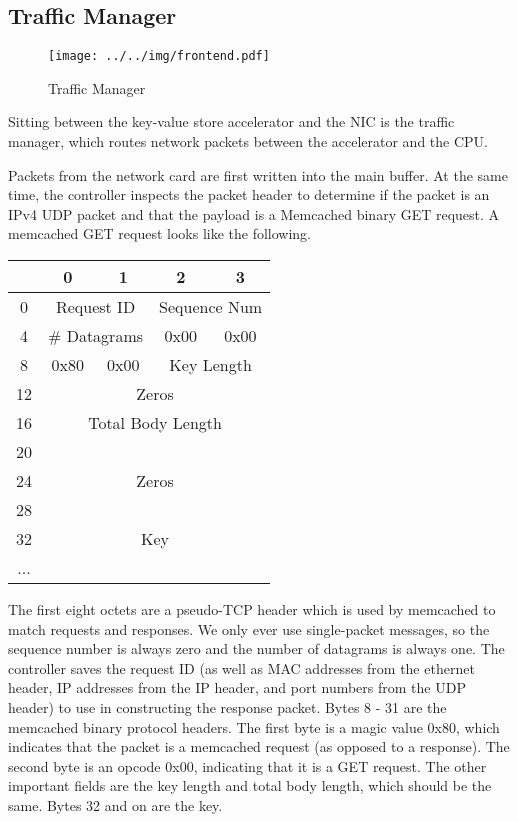 \subsection{Traffic Manager}
\begin{figure}
    \begin{center}
        \label{fig:frontend}  
\texttt{[image: ../../img/frontend.pdf]}
        \caption{Traffic Manager}
    \end{center}
\end{figure}

Sitting between the key-value store accelerator and the NIC is the traffic
manager, which routes network packets between the accelerator and the CPU.

Packets from the network card are first written into the main buffer.
At the same time, the controller inspects the packet header to determine if
the packet is an IPv4 UDP packet and that the payload is a Memcached binary
GET request. A memcached GET request looks like the following.

\begin{center}
    \begin{tabular}{|c|c|c|c|c|}
        \hline
          & 0 & 1 & 2 & 3 \\
        \hline
        0 & \multicolumn{2}{|c}{Request ID} & \multicolumn{2}{|c|}{Sequence Num} \\
        \hline
        4 & \multicolumn{2}{|c|}{\# Datagrams} & 0x00 & 0x00 \\
        \hline
        8 & 0x80 & 0x00 & \multicolumn{2}{c|}{Key Length} \\
        \hline
        12 & \multicolumn{4}{|c|}{Zeros} \\
        \hline
        16 & \multicolumn{4}{|c|}{Total Body Length} \\
        \hline
        20 & \multicolumn{4}{|c|}{\multirow{3}{*}{Zeros}} \\
        \cline{1-1}
        24 & \multicolumn{4}{|c|}{} \\
        \cline{1-1}
        28 & \multicolumn{4}{|c|}{} \\
        \hline
        32 & \multicolumn{4}{|c|}{Key} \\
        ... & \multicolumn{4}{|c|}{} \\
        \hline
    \end{tabular}
\end{center}

The first eight octets are a pseudo-TCP header which is used by memcached to
match requests and responses. We only ever use single-packet messages,
so the sequence number is always zero and the number of datagrams is 
always one. The controller saves the request ID (as well as MAC addresses
from the ethernet header, IP addresses from the IP header, and port numbers
from the UDP header) to use in constructing the response packet.
Bytes 8 - 31 are the memcached binary protocol headers. The first byte is a
magic value 0x80, which indicates that the packet is a memcached request
(as opposed to a response). The second byte is an opcode 0x00, indicating that
it is a GET request. The other important fields are the key length and total
body length, which should be the same. Bytes 32 and on are the key.

